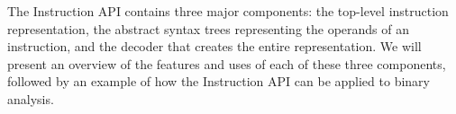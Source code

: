 
\label{group__moduleAbstractionIntro}
The Instruction API contains three major components: the top-\/level instruction representation, the abstract syntax trees representing the operands of an instruction, and the decoder that creates the entire representation. We will present an overview of the features and uses of each of these three components, followed by an example of how the Instruction API can be applied to binary analysis. 